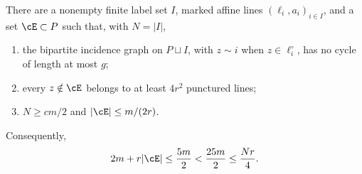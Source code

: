 \begin{lemma}\label{lem:incidence}
There are a nonempty finite label set \(I\), marked affine lines
\((\ell_i,a_i)_{i\in I}\), and a set \(\cE\subset P\) such that,
with \(N=|I|\),
\begin{enumerate}
\item the bipartite incidence graph on \(P\sqcup I\), with
\(z\sim i\) when \(z\in\ell_i^\circ\), has no cycle of length at most \(g\);
\item every \(z\notin\cE\) belongs to at least \(4r^2\) punctured lines;
\item \(N\ge cm/2\) and \(|\cE|\le m/(2r)\).
\end{enumerate}
Consequently,
\begin{equation}\label{eq:budget}
 2m+r|\cE|\le\frac{5m}{2}
 <\frac{25m}{2}\le\frac{Nr}{4}.
\end{equation}
\end{lemma}

